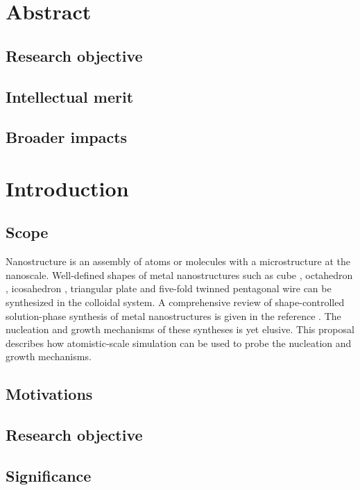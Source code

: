 \section{Abstract}

\subsection{Research objective}

\subsection{Intellectual merit}

\subsection{Broader impacts}

\section{Introduction}

\subsection{Scope}

Nanostructure is an assembly of atoms or molecules with a microstructure at the nanoscale. Well-defined shapes of metal nanostructures such as cube \cite{Im_2005}, octahedron \cite{Xia_2012}, icosahedron \cite{Xiong_2007}, triangular plate \cite{Lofton_2005} and five-fold twinned pentagonal wire \cite{Tsuji_2008} can be synthesized in the colloidal system. A comprehensive review of shape-controlled solution-phase synthesis of metal nanostructures is given in the reference \cite{Xia_2008}. The nucleation and growth mechanisms of these syntheses is yet elusive. This proposal describes how atomistic-scale simulation can be used to probe the nucleation and growth mechanisms.

\subsection{Motivations}

\subsection{Research objective}

\subsection{Significance}

